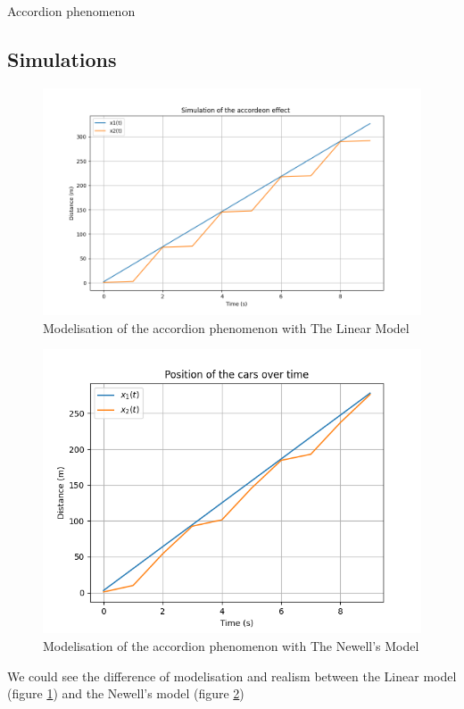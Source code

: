 \documentclass{beamer}
\begin{document}
\begin{frame}{Accordion phenomenon}
	\subsection{Simulations}
	\begin{minipage}{0.48\textwidth}
		\centering
		\begin{figure}
			\includegraphics[width=\textwidth]{Accordeon1.png}
			\caption{Modelisation of the accordion phenomenon with The Linear Model}
			\label{fig:AL}
		\end{figure}
	\end{minipage}\hfill
	\begin{minipage}{0.48\textwidth}
		\centering
		\begin{figure}
			\includegraphics[width=\textwidth]{1W2_Accord.png}
			\caption{Modelisation of the accordion phenomenon with The Newell's Model}
			\label{fig:AN}
		\end{figure}
	\end{minipage}
	\begin{block}{}
		We could see the difference of modelisation and realism between the Linear model (figure \ref{fig:AL}) and the Newell's model (figure \ref{fig:AN})
	\end{block}
\end{frame}
\end{document}
